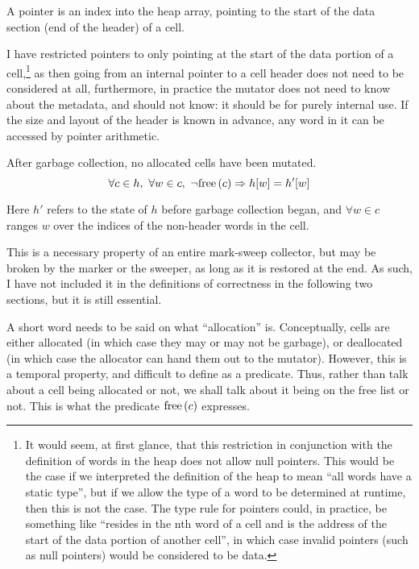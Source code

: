 \begin{definition}[Pointer]
  \label{def:ms-pointer}
  A pointer is an index into the heap array, pointing to the start of
  the data section (end of the header) of a cell.
\end{definition}

I have restricted pointers to only pointing at the start of the data
portion of a cell,\footnote{It would seem, at first glance, that this
  restriction in conjunction with the definition of words in the heap
  does not allow null pointers. This would be the case if we
  interpreted the definition of the heap to mean ``all words have a
  static type'', but if we allow the type of a word to be determined
  at runtime, then this is not the case. The type rule for pointers
  could, in practice, be something like ``resides in the nth word of a
  cell and is the address of the start of the data portion of another
  cell'', in which case invalid pointers (such as null pointers) would
  be considered to be data.} as then going from an internal pointer
to a cell header does not need to be considered at all, furthermore,
in practice the mutator does not need to know about the metadata, and
should not know: it should be for purely internal use. If the size and
layout of the header is known in advance, any word in it can be
accessed by pointer arithmetic.

\begin{definition}
  \label{def:ms-word-preservation}
  After garbage collection, no allocated cells have been mutated.
   \[\forall c \in h,\ \forall w \in c,\ \lnot\mathrm{free}\left(c\right) \Rightarrow h[w] =
   h'[w]\]

   Here $h'$ refers to the state of $h$ before garbage collection
   began, and $\forall w \in c$ ranges $w$ over the indices of the
   non-header words in the cell.
\end{definition}

This is a necessary property of an entire mark-sweep collector, but
may be broken by the marker or the sweeper, as long as it is restored
at the end. As such, I have not included it in the definitions of
correctness in the following two sections, but it is still essential.

A short word needs to be said on what ``allocation'' is. Conceptually,
cells are either allocated (in which case they may or may not be
garbage), or deallocated (in which case the allocator can hand them
out to the mutator). However, this is a temporal property, and
difficult to define as a predicate. Thus, rather than talk about a
cell being allocated or not, we shall talk about it being on the free
list or not. This is what the predicate $\mathrm{free}\left(c\right)$ expresses.

